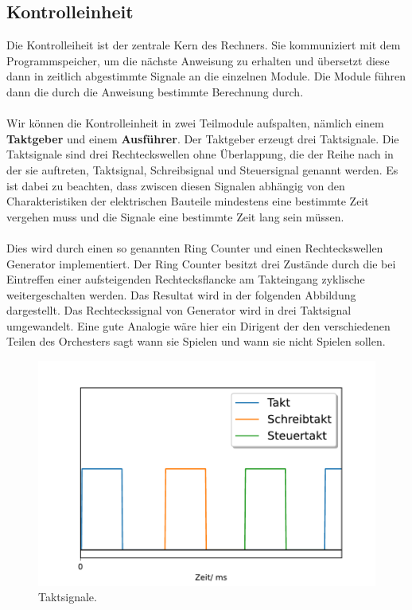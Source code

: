 \documentclass[11pt,a4paper,leqno]{report}
\numberwithin{equation}{chapter}
\begin{document}
\subsection{Kontrolleinheit}
Die Kontrolleiheit ist der zentrale Kern des Rechners. Sie kommuniziert mit dem Programmspeicher, um die n\"achste Anweisung zu erhalten und \"ubersetzt diese dann in zeitlich abgestimmte Signale an die einzelnen Module. Die Module f\"uhren dann die durch die Anweisung bestimmte Berechnung durch.
\\
\\
Wir k\"onnen die Kontrolleinheit in zwei Teilmodule aufspalten, n\"amlich einem \textbf{Taktgeber} und einem \textbf{Ausf\"uhrer}. Der Taktgeber erzeugt drei Taktsignale.
Die Taktsignale sind drei Rechteckswellen ohne \"Uberlappung, die der Reihe nach in der sie auftreten, Taktsignal, Schreibsignal und Steuersignal genannt werden.
Es ist dabei zu beachten, dass zwiscen diesen Signalen abh\"angig von den Charakteristiken der elektrischen Bauteile mindestens eine bestimmte Zeit vergehen muss und die Signale eine bestimmte Zeit lang sein m\"ussen.\\
\\
Dies wird durch einen so genannten Ring Counter und einen Rechteckswellen Generator implementiert. Der Ring Counter besitzt drei Zust\"ande durch die bei Eintreffen einer aufsteigenden Rechtecksflancke am Takteingang zyklische weitergeschalten werden. 
Das Resultat wird in der folgenden Abbildung dargestellt. Das Rechteckssignal von Generator wird in drei Taktsignal umgewandelt. Eine gute Analogie w\"are hier ein Dirigent der den verschiedenen Teilen des Orchesters sagt wann sie Spielen und wann sie nicht Spielen sollen.
\begin{figure}[H]
	\begin{center}
		\includegraphics[scale=0.6]{tz.pdf}
		\caption{Taktsignale.}
	\end{center}
\end{figure}
\end{document}
